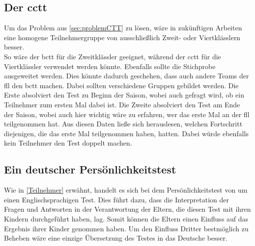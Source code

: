 \subsection*{Der \acrlong{cctt}}
Um das Problem aus \ref{sec:problemCTT} zu lösen, wäre in zukünftigen Arbeiten eine homogene Teilnehmergruppe von ausschließlich Zweit- oder Viertklässlern besser.\\
So wäre der \acrshort{bctt} für die Zweitklässler geeignet, während der \acrshort{cctt} für die Viertklässler verwendet werden könnte.
Ebenfalls sollte die Stichprobe ausgeweitet werden. Dies könnte dadurch geschehen, dass auch andere Teams der \acrshort{fll} den \acrshort{bctt} machen. Dabei sollten verschiedene Gruppen gebildet werden. Die Erste absolviert den Test zu Beginn der Saison, wobei auch gefragt wird, ob ein Teilnehmer zum ersten Mal dabei ist. Die Zweite absolviert den Test am Ende der Saison, wobei auch hier wichtig wäre zu erfahren, wer das erste Mal an der \acrshort{fll} teilgenommen hat. Aus diesen Daten ließe sich herauslesen, welchen Fortschritt diejenigen, die das erste Mal teilgenommen haben, hatten. Dabei würde ebenfalls kein Teilnehmer den Test doppelt machen.

\subsection*{Ein deutscher Persönlichkeitstest}
Wie in \ref{Teilnehmer} erwähnt, handelt es sich bei dem Persönlichkeitstest von  um einen Englischsprachigen Test. Dies führt dazu, dass die Interpretation der Fragen und Antworten in der Verantwortung der Eltern, die diesen Test mit ihren Kindern durchgeführt haben, lag. Somit können die Eltern einen Einfluss auf das Ergebnis ihrer Kinder genommen haben. Um den Einfluss Dritter bestmöglich zu Beheben wäre eine einzige Übersetzung des Testes in das Deutsche besser.


